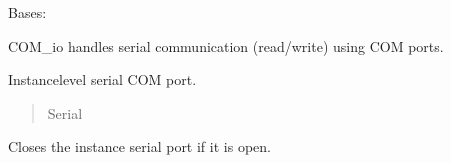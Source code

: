 \documentclass[letterpaper,10pt,english]{sphinxmanual}
\begin{document}
\begin{fulllineitems}
\label{\detokenize{PodApi.Devices.SerialPorts:PodApi.Devices.SerialPorts.SerialComm.PortIO}}
\pysigstartsignatures
{}
\pysigstopsignatures
\sphinxAtStartPar
Bases: 

\sphinxAtStartPar
COM\_io handles serial communication (read/write) using COM ports.

\begin{fulllineitems}
\label{\detokenize{PodApi.Devices.SerialPorts:PodApi.Devices.SerialPorts.SerialComm.PortIO.__serialInst}}
\pysigstartsignatures
{}
\pysigstopsignatures
\sphinxAtStartPar
Instance\sphinxhyphen{}level serial COM port.
\begin{quote}\begin{description}
\sphinxAtStartPar
Serial

\end{description}\end{quote}

\end{fulllineitems}


\begin{fulllineitems}
\label{\detokenize{PodApi.Devices.SerialPorts:PodApi.Devices.SerialPorts.SerialComm.PortIO.CloseSerialPort}}
\pysigstartsignatures
{}
\pysigstopsignatures
\sphinxAtStartPar
Closes the instance serial port if it is open.

\end{fulllineitems}


\end{fulllineitems}
\end{document}
